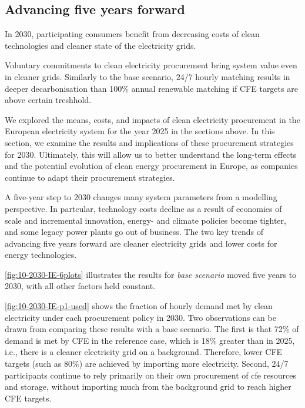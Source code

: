 \subsection{Advancing five years forward}
\label{subsec:time}

\vspace{10pt}
\begin{res}
    In 2030, participating consumers benefit from decreasing costs of clean technologies and cleaner state of the electricity grids.
\end{res}

\vspace{5pt}
\begin{res}
    Voluntary commitments to clean electricity procurement bring system value even in
    cleaner grids. Similarly to the base scenario, 24/7 hourly matching results in deeper decarbonisation than 100\% annual renewable matching if CFE targets are above certain treshhold.
\end{res}

We explored the means, costs, and impacts of clean electricity procurement in the European electricity system for the year 2025 in the sections above.
In this section, we examine the results and implications of these procurement strategies for 2030.
Ultimately, this will allow us to better understand the long-term effects and the potential evolution of clean energy procurement in Europe, as companies continue to adapt their procurement strategies.

A five-year step to 2030 changes many system parameters from a modelling perspective.
In partcular, technology costs decline as a result of economies of scale and incremental innovation, energy- and climate policies become tighter, and some legacy power plants go out of business.
The two key trends of advancing five years forward are cleaner electricity grids and lower costs for energy technologies.

\cref{fig:10-2030-IE-6plots} illustrates the results for \textit{base scenario} moved five years to 2030, with all other factors held constant. 

\cref{fig:10-2030-IE-p1-used} shows the fraction of hourly demand met by clean electricity under each procurement policy in 2030.
Two observations can be drawn from comparing these results with a base scenario.
The first is that 72\% of demand is met by CFE in the reference case, which is 18\% greater than in 2025, i.e., there is a cleaner electricity grid on a background.
Therefore, lower CFE targets (such as 80\%) are achieved by importing more electricity.
Second, 24/7 participants continue to rely primarily on their own procurement of \gls{cfe} resources and storage, without importing much from the background grid to reach higher CFE targets.

